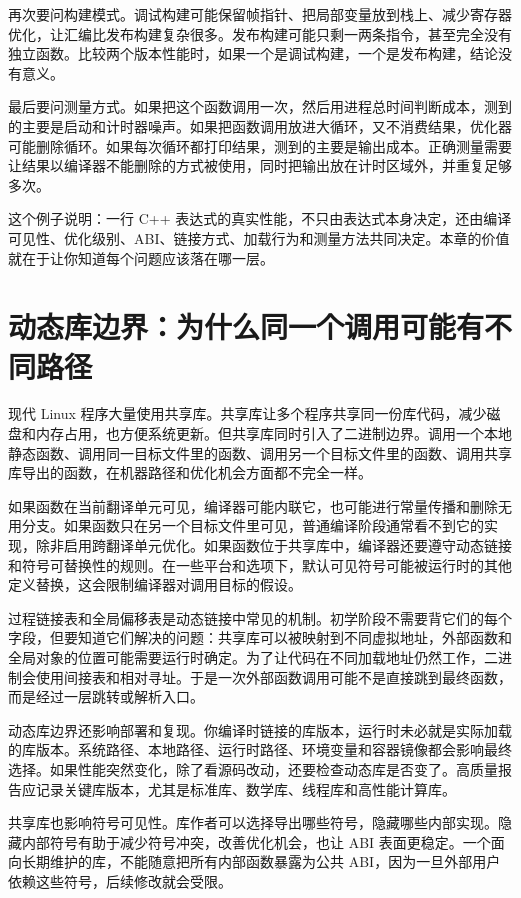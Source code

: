 再次要问构建模式。调试构建可能保留帧指针、把局部变量放到栈上、减少寄存器优化，让汇编比发布构建复杂很多。发布构建可能只剩一两条指令，甚至完全没有独立函数。比较两个版本性能时，如果一个是调试构建，一个是发布构建，结论没有意义。

最后要问测量方式。如果把这个函数调用一次，然后用进程总时间判断成本，测到的主要是启动和计时器噪声。如果把函数调用放进大循环，又不消费结果，优化器可能删除循环。如果每次循环都打印结果，测到的主要是输出成本。正确测量需要让结果以编译器不能删除的方式被使用，同时把输出放在计时区域外，并重复足够多次。

这个例子说明：一行 C++ 表达式的真实性能，不只由表达式本身决定，还由编译可见性、优化级别、ABI、链接方式、加载行为和测量方法共同决定。本章的价值就在于让你知道每个问题应该落在哪一层。

\section{动态库边界：为什么同一个调用可能有不同路径}

现代 Linux 程序大量使用共享库。共享库让多个程序共享同一份库代码，减少磁盘和内存占用，也方便系统更新。但共享库同时引入了二进制边界。调用一个本地静态函数、调用同一目标文件里的函数、调用另一个目标文件里的函数、调用共享库导出的函数，在机器路径和优化机会方面都不完全一样。

如果函数在当前翻译单元可见，编译器可能内联它，也可能进行常量传播和删除无用分支。如果函数只在另一个目标文件里可见，普通编译阶段通常看不到它的实现，除非启用跨翻译单元优化。如果函数位于共享库中，编译器还要遵守动态链接和符号可替换性的规则。在一些平台和选项下，默认可见符号可能被运行时的其他定义替换，这会限制编译器对调用目标的假设。

过程链接表和全局偏移表是动态链接中常见的机制。初学阶段不需要背它们的每个字段，但要知道它们解决的问题：共享库可以被映射到不同虚拟地址，外部函数和全局对象的位置可能需要运行时确定。为了让代码在不同加载地址仍然工作，二进制会使用间接表和相对寻址。于是一次外部函数调用可能不是直接跳到最终函数，而是经过一层跳转或解析入口。

动态库边界还影响部署和复现。你编译时链接的库版本，运行时未必就是实际加载的库版本。系统路径、本地路径、运行时路径、环境变量和容器镜像都会影响最终选择。如果性能突然变化，除了看源码改动，还要检查动态库是否变了。高质量报告应记录关键库版本，尤其是标准库、数学库、线程库和高性能计算库。

共享库也影响符号可见性。库作者可以选择导出哪些符号，隐藏哪些内部实现。隐藏内部符号有助于减少符号冲突，改善优化机会，也让 ABI 表面更稳定。一个面向长期维护的库，不能随意把所有内部函数暴露为公共 ABI，因为一旦外部用户依赖这些符号，后续修改就会受限。

